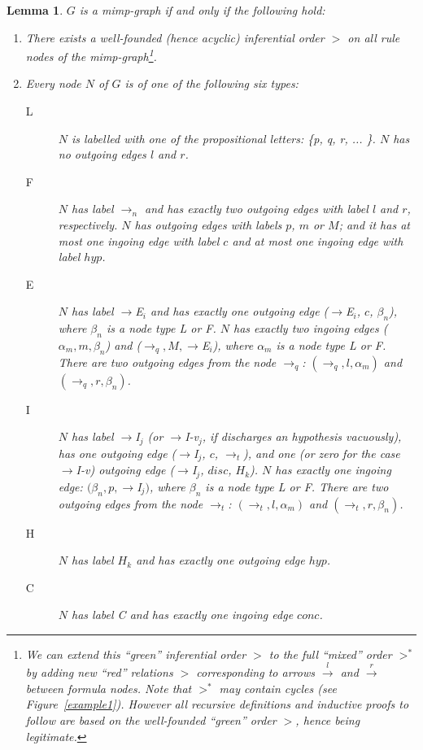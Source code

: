 \documentclass[submission,copyright,creativecommons]{eptcs}
\newtheorem{lemma}{Lemma}
\begin{document}
\begin{lemma}
$G$ is a mimp-graph if and only if the following hold: \label{lem-PG}

\begin{enumerate}
\item  There exists a well-founded (hence acyclic) inferential order $>$ on
all rule nodes of the mimp-graph\footnote{We can extend this ``green'' inferential order $>$ to the full ``mixed''
order $>^*$ by adding new ``red'' relations $>$ corresponding to arrows $\xrightarrow{l}$ and $\xrightarrow{r}$ between formula nodes. Note that $>^*$
may contain cycles (see Figure~\ref{example1}). However all recursive
definitions and inductive proofs to follow are based on the well-founded
``green'' order $>$, hence being legitimate.}.


\item  Every node $N$ of $G$ is of one of the following six types:

\begin{description}
\item[L \ \ \ ]  $N$ is labelled with one of the propositional letters: \{p,
q, r, ... \}. $N$ has no outgoing edges $l$ and $r$.

\item[F \ \ \ ]  $N$ has label $\to_n$ and has exactly two outgoing edges
with label $l$ and $r$, respectively. $N$ has outgoing edges with labels $p$, 
$m$ or $M$; and it has at most one ingoing edge with label $c$ and at
most one ingoing edge with label $hyp$.

\item[E \ \ \ ]  $N$ has label $\to$E$_i$ and has exactly one outgoing edge 
($\to$E$_i$, $c$, $\beta_n$), where $\beta_n$ is a node type \emph{L} or 
\emph{F}. $N$ has exactly two ingoing edges ($\alpha_m, m, \beta_n$) and 
($\to_q, M, \to$E$_i$), where $\alpha_m$ is a node type \emph{L} or \emph{F}.
There are two outgoing edges from the node $\to_q$: $(\to_q, l,\alpha_m)$
and $(\to_q, r, \beta_n)$.

\item[I \ \ \ ]  $N$ has label $\to$I$_j$ (or  $\to$I-v$_j$, if discharges an hypothesis vacuously), has one outgoing edge ($\to$I$_j$, $c$, $\to_t$), and one (or zero for the case $\to$I-v) outgoing edge ($\to$I$_j$, $disc$, $H_k$). 
$N$ has exactly one ingoing edge: $(\beta_n, p, \to$I$_j)$, where $\beta_n$
is a node type \emph{L} or \emph{F}. There are two outgoing edges from the
node $\to_t$: $(\to_t, l, \alpha_m)$ and $(\to_t, r, \beta_n)$.

\item[H \ \ \ ]  $N$ has label \emph{$H_k$} and has exactly one outgoing
edge $hyp$.

\item[C \ \ \ ]  $N$ has label \emph{C} and has exactly one ingoing edge $conc$.
\end{description}
\end{enumerate}
\end{lemma}
\end{document}

